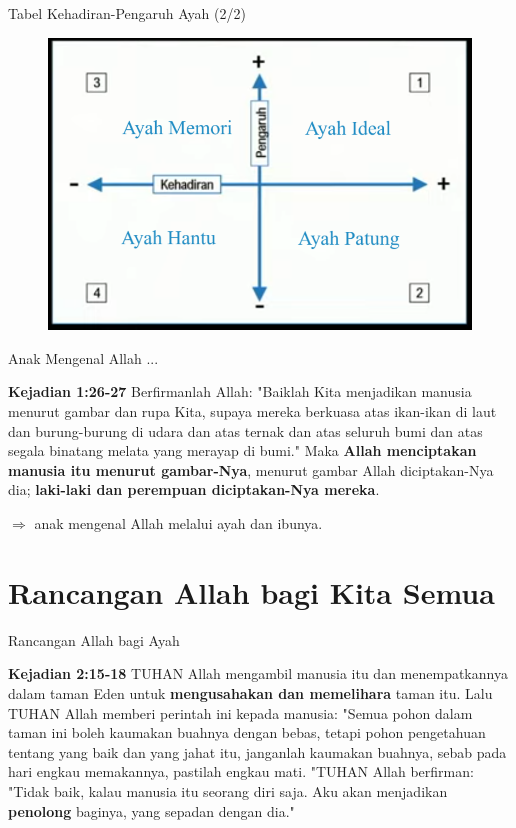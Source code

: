 \documentclass{beamer}
\theoremstyle{mystyle}
\begin{document}
\begin{frame}{Tabel Kehadiran-Pengaruh Ayah (2/2)}
	\begin{figure}[!ht]
		\centering
		\includegraphics[scale=.3]{images/tabel-ayah-komplit}
	\end{figure}
\end{frame}

\begin{frame}{Anak Mengenal Allah ...}	
	\begin{block}{\textbf{Kejadian 1:26-27}}
	Berfirmanlah Allah: "Baiklah Kita menjadikan manusia menurut gambar dan rupa Kita, supaya mereka berkuasa atas ikan-ikan di laut dan burung-burung di udara dan atas ternak dan atas seluruh bumi dan atas segala binatang melata yang merayap di bumi." Maka \textbf{Allah menciptakan manusia itu menurut gambar-Nya}, menurut gambar Allah diciptakan-Nya dia; \textbf{laki-laki dan perempuan diciptakan-Nya mereka}. 	
	\end{block}
	
	\bigskip
	$\Longrightarrow$ anak mengenal Allah melalui ayah dan ibunya.
\end{frame}

\section{Rancangan Allah bagi Kita Semua}
\begin{frame}{Rancangan Allah bagi Ayah}	
	\begin{block}{\textbf{Kejadian 2:15-18}}
TUHAN Allah mengambil manusia itu dan menempatkannya dalam taman Eden untuk \textbf{mengusahakan dan memelihara} taman itu. Lalu TUHAN Allah memberi perintah ini kepada manusia: "Semua pohon dalam taman ini boleh kaumakan buahnya dengan bebas, tetapi pohon pengetahuan tentang yang baik dan yang jahat itu, janganlah kaumakan buahnya, sebab pada hari engkau memakannya, pastilah engkau mati. "TUHAN Allah berfirman: "Tidak baik, kalau manusia itu seorang diri saja. Aku akan menjadikan \textbf{penolong} baginya, yang sepadan dengan dia."
	\end{block}
\end{frame}
\end{document}

